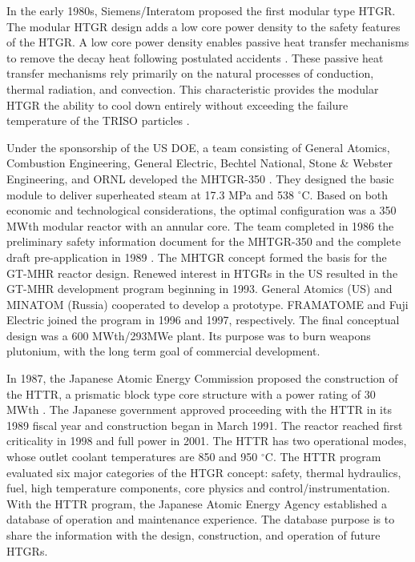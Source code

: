 In the early 1980s, Siemens/Interatom proposed the first modular type HTGR.
The modular HTGR design adds a low core power density to the safety features of the HTGR.
A low core power density enables passive heat transfer mechanisms to remove the decay heat following postulated accidents \cite{neylan_modular_1988}.
These passive heat transfer mechanisms rely primarily on the natural processes of conduction, thermal radiation, and convection.
This characteristic provides the modular HTGR the ability to cool down entirely without exceeding the failure temperature of the TRISO particles \cite{brey_development_2001}.

Under the sponsorship of the \gls{US} \gls{DOE}, a team consisting of General Atomics, Combustion Engineering, General Electric, Bechtel National, Stone \& Webster Engineering, and \gls{ORNL} developed the \gls{MHTGR}-350 \cite{neylan_modular_1988} \cite{silady_licensing_1988}.
They designed the basic module to deliver superheated steam at 17.3 MPa and 538 $^{\circ}$C.
Based on both economic and technological considerations, the optimal configuration was a 350 MWth modular reactor with an annular core.
The team completed in 1986 the preliminary safety information document for the MHTGR-350 and the complete draft pre-application in 1989 \cite{huning_steady_2014}.
The MHTGR concept formed the basis for the \gls{GT-MHR} reactor design.
Renewed interest in HTGRs in the US resulted in the GT-MHR development program beginning in 1993.
General Atomics (US) and MINATOM (Russia) cooperated to develop a prototype.
FRAMATOME and Fuji Electric joined the program in 1996 and 1997, respectively.
The final conceptual design was a 600 MWth/293MWe plant.
Its purpose was to burn weapons plutonium, with the long term goal of commercial development.

In 1987, the Japanese Atomic Energy Commission proposed the construction of the \gls{HTTR}, a prismatic block type core structure with a power rating of 30 MWth \cite{iaea_current_2001}.
The Japanese government approved proceeding with the HTTR in its 1989 fiscal year and construction began in March 1991.
The reactor reached first criticality in 1998 and full power in 2001.
The HTTR has two operational modes, whose outlet coolant temperatures are 850 and 950 $^{\circ}$C.
The HTTR program evaluated six major categories of the HTGR concept: safety, thermal hydraulics, fuel, high temperature components, core physics and control/instrumentation.
With the HTTR program, the Japanese Atomic Energy Agency established a database of operation and maintenance experience.
The database purpose is to share the information with the design, construction, and operation of future HTGRs.

